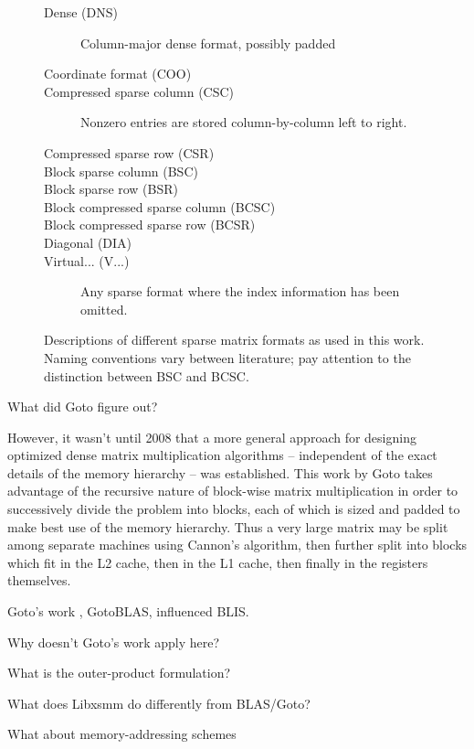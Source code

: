 \begin{figure}

\begin{description}
	\item[Dense (DNS)] Column-major dense format, possibly padded
	\item[Coordinate format (COO)] 
	\item[Compressed sparse column (CSC)] Nonzero entries are stored column-by-column left to right. 
	\item[Compressed sparse row (CSR)]
	\item[Block sparse column (BSC)]
	\item[Block sparse row (BSR)]
	\item[Block compressed sparse column (BCSC)]
	\item[Block compressed sparse row (BCSR)]
	\item[Diagonal (DIA)]
	\item[Virtual... (V...)] Any sparse format where the index information has been omitted.
\end{description}


\caption{Descriptions of different sparse matrix formats as used in this work. Naming conventions vary between literature; pay attention to the distinction between BSC and BCSC. }
\label{fig:formats}
\end{figure}

What did Goto figure out?

However, it wasn't until 2008 that a more general approach for designing optimized dense matrix multiplication algorithms -- independent of the exact details of the memory hierarchy -- was established. This work by Goto takes advantage of the recursive nature of block-wise matrix multiplication in order to successively divide the problem into blocks, each of which is sized and padded to make best use of the memory hierarchy. Thus a very large matrix may be split among separate machines using Cannon's algorithm, then further split into blocks which fit in the L2 cache, then in the L1 cache, then finally in the registers themselves. 

Goto's work , GotoBLAS, influenced BLIS. 


Why doesn't Goto's work apply here?

What is the outer-product formulation?

What does Libxsmm do differently from BLAS/Goto?

What about memory-addressing schemes

